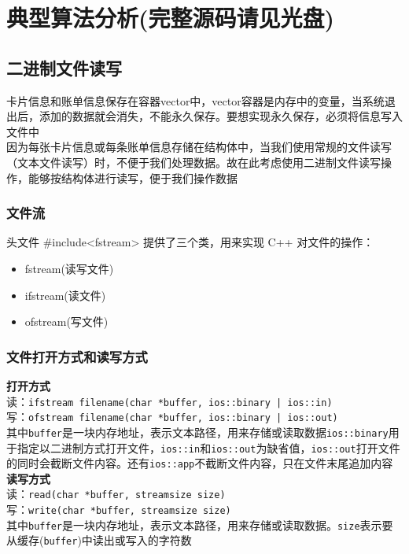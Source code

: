\documentclass[UTF8]{ctexart}
\begin{document}
	\section{典型算法分析(完整源码请见光盘)}
	\subsection{二进制文件读写}
	\qquad 卡片信息和账单信息保存在容器vector中，vector容器是内存中的变量，当系统退出后，添加的数据就会消失，不能永久保存。要想实现永久保存，必须将信息写入文件中 \\
	\qquad 因为每张卡片信息或每条账单信息存储在结构体中，当我们使用常规的文件读写（文本文件读写）时，不便于我们处理数据。故在此考虑使用二进制文件读写操作，能够按结构体进行读写，便于我们操作数据 \\
	
	\subsubsection{文件流}
	\qquad 头文件 \#include<fstream> 提供了三个类，用来实现 C++ 对文件的操作：
	\begin{itemize}[leftmargin=3em]
		\item fstream(读写文件)
		\item ifstream(读文件)
		\item ofstream(写文件)
	\end{itemize}
	
	\subsubsection{文件打开方式和读写方式}
	{\bfseries 打开方式} \\
	\qquad 读：\lstinline{ifstream filename(char *buffer, ios::binary | ios::in)} \\
	\qquad 写：\lstinline{ofstream filename(char *buffer, ios::binary | ios::out)} \\
	\qquad 其中\lstinline{buffer}是一块内存地址，表示文本路径，用来存储或读取数据\lstinline{ios::binary}用于指定以二进制方式打开文件，\lstinline{ios::in}和\lstinline{ios::out}为缺省值，\lstinline{ios::out}打开文件的同时会截断文件内容。还有\lstinline{ios::app}不截断文件内容，只在文件末尾追加内容 \\
	{\bfseries 读写方式} \\
	\qquad 读：\lstinline{read(char *buffer, streamsize size)} \\
	\qquad 写：\lstinline{write(char *buffer, streamsize size)} \\
	\qquad 其中\lstinline{buffer}是一块内存地址，表示文本路径，用来存储或读取数据。\lstinline{size}表示要从缓存(\lstinline{buffer})中读出或写入的字符数
	
\end{document}
